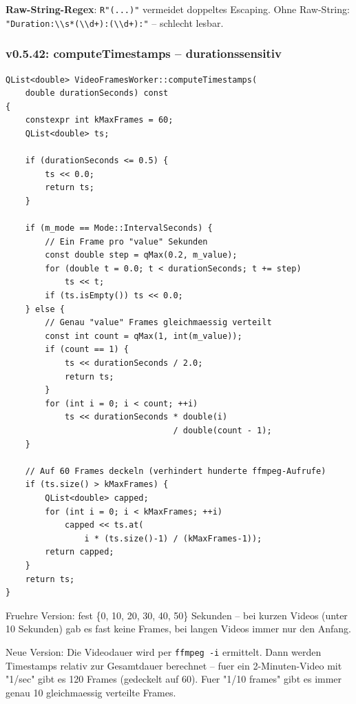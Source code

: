 \textbf{Raw-String-Regex}: \verb|R"(...)"| vermeidet
doppeltes Escaping. Ohne Raw-String:
\verb|"Duration:\\s*(\\d+):(\\d+):"| -- schlecht lesbar.

\subsubsection{v0.5.42: computeTimestamps -- durationssensitiv}

\begin{lstlisting}[caption={computeTimestamps: IntervalSeconds und FixedCount}]
QList<double> VideoFramesWorker::computeTimestamps(
    double durationSeconds) const
{
    constexpr int kMaxFrames = 60;
    QList<double> ts;

    if (durationSeconds <= 0.5) {
        ts << 0.0;
        return ts;
    }

    if (m_mode == Mode::IntervalSeconds) {
        // Ein Frame pro "value" Sekunden
        const double step = qMax(0.2, m_value);
        for (double t = 0.0; t < durationSeconds; t += step)
            ts << t;
        if (ts.isEmpty()) ts << 0.0;
    } else {
        // Genau "value" Frames gleichmaessig verteilt
        const int count = qMax(1, int(m_value));
        if (count == 1) {
            ts << durationSeconds / 2.0;
            return ts;
        }
        for (int i = 0; i < count; ++i)
            ts << durationSeconds * double(i)
                                  / double(count - 1);
    }

    // Auf 60 Frames deckeln (verhindert hunderte ffmpeg-Aufrufe)
    if (ts.size() > kMaxFrames) {
        QList<double> capped;
        for (int i = 0; i < kMaxFrames; ++i)
            capped << ts.at(
                i * (ts.size()-1) / (kMaxFrames-1));
        return capped;
    }
    return ts;
}
\end{lstlisting}

\begin{neuin}[title={Neu in v0.5.42: Dauer-bewusste Timestamps}]
Fruehre Version: fest \{0, 10, 20, 30, 40, 50\} Sekunden --
bei kurzen Videos (unter 10 Sekunden) gab es fast keine
Frames, bei langen Videos immer nur den Anfang.

Neue Version: Die Videodauer wird per \verb|ffmpeg -i|
ermittelt. Dann werden Timestamps relativ zur Gesamtdauer
berechnet -- fuer ein 2-Minuten-Video mit "1/sec" gibt
es 120 Frames (gedeckelt auf 60). Fuer "1/10 frames" gibt
es immer genau 10 gleichmaessig verteilte Frames.
\end{neuin}


